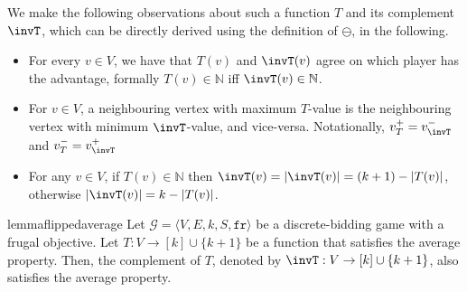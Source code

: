 \documentclass{article}\providecommand{\nequiv}{\not\equiv}\usepackage[a4paper,margin=20mm]{geometry}
\newcommand{\G}{{\mathcal G}}
\newcommand{\fr}{\texttt{fr}}
\newcommand{\Nat}{\mathbb{N}}
\newcommand{\zug}[1]{\langle #1  \rangle}
\begin{document}
\begin{observation}\label{obs: property}
	We make the following observations about such a function \(T\) and its complement \(\invT\), which can be directly derived using the definition of \(\ominus\), in the following.
	
	\begin{itemize}
		\item[\textbf{I.} ]
		For every $v \in V$, we have that $T(v)$ and $\invT(v)$ agree on which player has the advantage, formally \(T(v) \in \Nat\) iff \(\invT(v) \in \Nat\).  
		
		\item[\textbf{II.}] For $v \in V$, a neighbouring vertex with maximum \(T\)-value is the neighbouring vertex with minimum \(\invT\)-value, and vice-versa. 
		Notationally, \(v^+_T = v^-_{\invT}\) and \(v^-_T = v^+_{\invT}\)
		
		\item[\textbf{III}] For any \(v \in V\), if \(T(v) \in \Nat\) then \(\invT(v) = |\invT(v)| = (k+1) - |T(v)|\), otherwise \(|\invT(v)| = k - |T(v)|\). 		
	\end{itemize}
\end{observation}
 




\begin{restatable}{lemma}{flippedaverage}
	\label{lem:flippedaverage}
	Let $\G = \zug{V, E, k, S, \fr}$ be a discrete-bidding game with a frugal objective. Let \(T: V \rightarrow [k] \cup \{k+1\}\) be a function that satisfies the average property. 
	Then, the complement of \(T\), denoted by \(\invT: V \rightarrow [k] \cup \{k+1\}\),  also satisfies the average property. 

\end{restatable}
\end{document}
